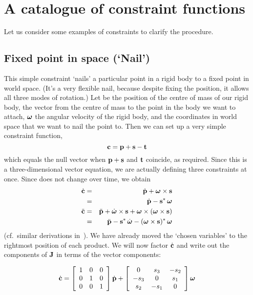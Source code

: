 \section{A catalogue of constraint functions\label{constraintAppendix}}

Let us consider some examples of constraints to clarify the procedure.

\subsection{Fixed point in space (`Nail')\label{constrNail}}

This simple constraint `nails' a particular point in a rigid body to a fixed point
in world space. (It's a very flexible nail, because despite fixing the position, it allows all
three modes of rotation.) Let  be the position of the centre of mass of our rigid
body,  the vector from the centre of mass to the point in the body we want to attach,
$\ve{\omega}$ the angular velocity of the rigid body, and  the coordinates in world
space that we want to nail the point to. Then we can set up a very simple constraint function,
\begin{equation}
\ve{c} = \ve{p} + \ve{s} - \ve{t}
\end{equation}
which equals the null vector when $\ve{p}+\ve{s}$ and $\ve{t}$ coincide, as required.
Since this is a three-dimensional vector equation, we are actually defining three constraints
at once. Since  does not change over time, we obtain
\begin{eqnarray}
\dot{\ve{c}} &=& \dot{\ve{p}} + \ve{\omega}\times\ve{s} \nonumber\\
&=& \dot{\ve{p}} - \dual{\ve{s}}\,\ve{\omega} \\
\ddot{\ve{c}} &=& \ddot{\ve{p}} + \dot{\ve{\omega}}\times\ve{s} +
    \ve{\omega}\times(\ve{\omega}\times\ve{s}) \nonumber\\
&=& \ddot{\ve{p}} - \dual{\ve{s}}\,\dot{\ve{\omega}} -
    \dual{(\ve{\omega}\times\ve{s})}\,\ve{\omega}
\end{eqnarray}
(cf.\ similar derivations in~\cite{Kalra:95}). We have already moved the `chosen variables' to
the rightmost position of each product. We will now factor $\dot{\ve{c}}$ and write out the
components of $\m{J}$ in terms of the vector components:

\begin{equation}
\label{constrEx1J}
\dot{\ve{c}} = \left[\begin{array}{ccc} 1&0&0\\0&1&0\\0&0&1 \end{array}\right]
    \dot{\ve{p}} + \left[\begin{array}{ccc}
    0 & s_3 & -s_2 \\ -s_3 & 0 & s_1 \\ s_2 & -s_1 & 0
    \end{array}\right] \ve{\omega}
\end{equation}


